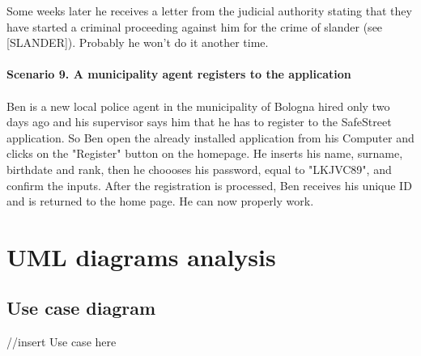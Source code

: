 \documentclass[a4paper]{report}
\begin{document}
Some weeks later he receives a letter from the judicial authority stating that they have started a criminal proceeding against him for the crime of slander (see [SLANDER]).
Probably he won’t do it another time. 
\\ 
\\
\textbf{Scenario 9. A municipality agent registers to the application}\\
\\
Ben is a new local police agent in the municipality of Bologna hired only two days ago and his supervisor says him that he has to register to the SafeStreet application. So Ben open the already installed application from his Computer and clicks on the "Register" button on the homepage. He inserts his name, surname, birthdate and rank, then he choooses his password, equal to "LKJVC89", and confirm the inputs. After the registration is processed, Ben receives his unique ID and is returned to the home page. He can now properly work.

\section{UML diagrams analysis}

\subsection{Use case diagram}

//insert Use case here
\end{document}
